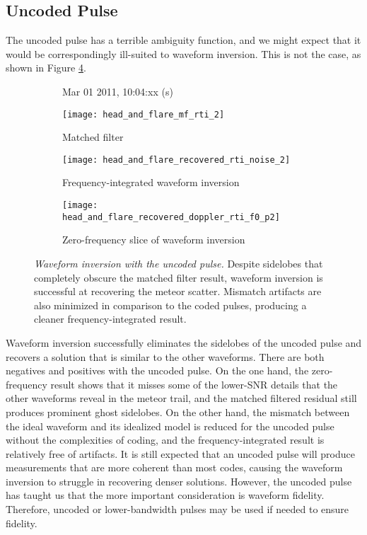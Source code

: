 \subsection{Uncoded Pulse}
The uncoded pulse has a terrible ambiguity function, and we might expect that it would be correspondingly ill-suited to waveform inversion. This is not the case, as shown in Figure \ref{fig:unc_comparison}.
\begin{figure}[tpb]
 \vspace{-1.5\baselineskip}
 \begin{subfigure}{\textwidth}
  \centering
  \textsf{\footnotesize Mar 01 2011, 10:04:xx (s)}
  
  \texttt{[image: head\_and\_flare\_mf\_rti\_2]}
  \caption{Matched filter}
  \label{fig:unc_mf}
 \end{subfigure}
 
 \vspace{0.5\baselineskip}
 \begin{subfigure}{\textwidth}
  \centering
  \texttt{[image: head\_and\_flare\_recovered\_rti\_noise\_2]}
  \caption{Frequency-integrated waveform inversion}
  \label{fig:unc_recovered}
 \end{subfigure}
 
 \vspace{0.5\baselineskip}
 \begin{subfigure}{\textwidth}
  \centering
  \texttt{[image: head\_and\_flare\_recovered\_doppler\_rti\_f0\_p2]}
  \caption{Zero-frequency slice of waveform inversion}
  \label{fig:unc_recovered_dopplerslice}
 \end{subfigure}
 \caption[Waveform inversion with the uncoded pulse]{\emph{Waveform inversion with the uncoded pulse.} Despite sidelobes that completely obscure the matched filter result, waveform inversion is successful at recovering the meteor scatter. Mismatch artifacts are also minimized in comparison to the coded pulses, producing a cleaner frequency-integrated result.}
 \label{fig:unc_comparison}
\end{figure}%
Waveform inversion successfully eliminates the sidelobes of the uncoded pulse and recovers a solution that is similar to the other waveforms. There are both negatives and positives with the uncoded pulse. On the one hand, the zero-frequency result shows that it misses some of the lower-SNR details that the other waveforms reveal in the meteor trail, and the matched filtered residual still produces prominent ghost sidelobes. On the other hand, the mismatch between the ideal waveform and its idealized model is reduced for the uncoded pulse without the complexities of coding, and the frequency-integrated result is relatively free of artifacts. It is still expected that an uncoded pulse will produce measurements that are more coherent than most codes, causing the waveform inversion to struggle in recovering denser solutions. However, the uncoded pulse has taught us that the more important consideration is waveform fidelity. Therefore, uncoded or lower-bandwidth pulses may be used if needed to ensure fidelity.

